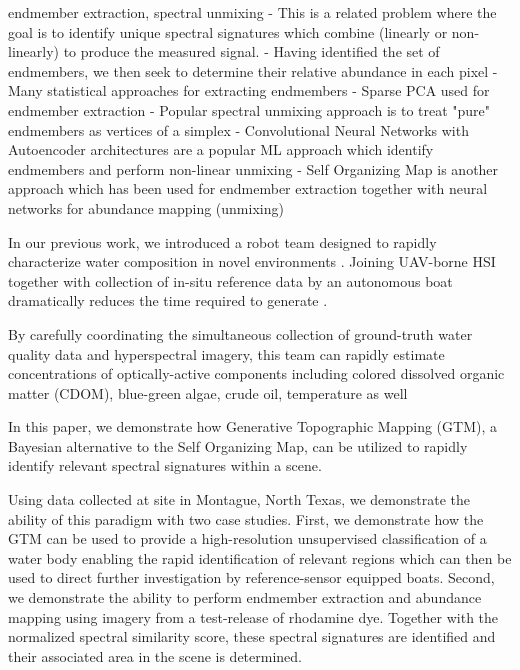 \documentclass{article}
\begin{document}
endmember extraction, spectral unmixing
- This is a related problem where the goal is to identify unique spectral signatures which combine (linearly or non-linearly) to produce the measured signal.
- Having identified the set of endmembers, we then seek to determine their relative abundance in each pixel
- Many statistical approaches for extracting endmembers \cite{berman2004ice}
- Sparse PCA used for endmember extraction \cite{yousefi2016mineral}
- Popular spectral unmixing approach is to treat "pure" endmembers as vertices of a simplex \cite{plaza2012endmember, nascimento2005vertex}
- Convolutional Neural Networks with Autoencoder architectures are a popular ML approach which identify endmembers and perform non-linear unmixing \cite{palsson2020convolutional, non-negative-autoencoders, su2019daen, borsoi2019deep}
- Self Organizing Map is another approach which has been used for endmember extraction together with neural networks for abundance mapping (unmixing) \cite{cantero2004analysis}



In our previous work, we introduced a robot team designed to rapidly characterize water composition in novel environments \cite{robot-team-1}. 
Joining UAV-borne HSI together with collection of in-situ reference data by an autonomous boat dramatically reduces the time required to generate .

By carefully coordinating the simultaneous collection of ground-truth water quality data and hyperspectral imagery, this team can rapidly estimate concentrations of optically-active components including colored dissolved organic matter (CDOM), blue-green algae, crude oil, temperature as well 


In this paper, we demonstrate how Generative Topographic Mapping (GTM), a Bayesian alternative to the Self Organizing Map, can be utilized to rapidly identify relevant spectral signatures within a scene.

Using data collected at site in Montague, North Texas, we demonstrate the ability of this paradigm with two case studies. First, we demonstrate how the GTM can be used to provide a high-resolution unsupervised classification of a water body enabling the rapid identification of relevant regions which can then be used to direct further investigation by reference-sensor equipped boats. Second, we demonstrate the ability to perform endmember extraction and abundance mapping using imagery from a test-release of rhodamine dye. Together with the normalized spectral similarity score, these spectral signatures are identified and their associated area in the scene is determined.
\end{document}
